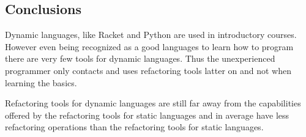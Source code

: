 

\subsection{Conclusions}







Dynamic languages, like Racket and Python are used in introductory courses. However even being recognized as a good languages to learn how to program there are very few tools for dynamic languages. Thus the unexperienced programmer only contacts and uses refactoring tools latter on and not when learning the basics.

Refactoring tools for dynamic languages are still far away from the capabilities offered by the refactoring tools for static languages and in average have less refactoring operations than the refactoring tools for static languages.

